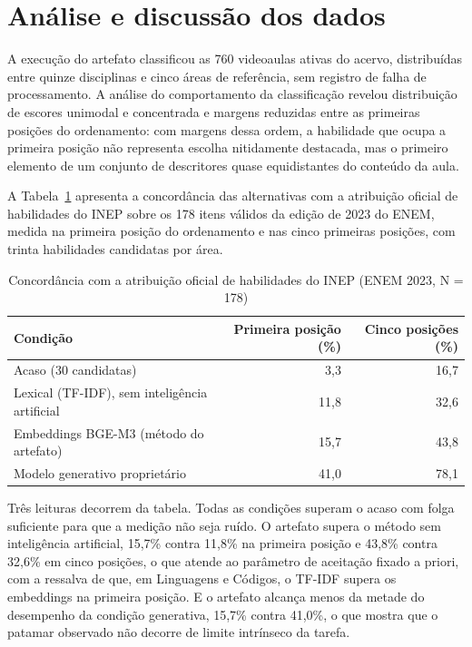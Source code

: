 
\section{Análise e discussão dos dados}

A execução do artefato classificou as 760 videoaulas ativas do acervo,
distribuídas entre quinze disciplinas e cinco áreas de referência, sem registro
de falha de processamento. A análise do comportamento da classificação revelou
distribuição de escores unimodal e concentrada e margens reduzidas entre as
primeiras posições do ordenamento: com margens dessa ordem, a habilidade que
ocupa a primeira posição não representa escolha nitidamente destacada, mas o
primeiro elemento de um conjunto de descritores quase equidistantes do conteúdo
da aula.

A Tabela~\ref{tab:concordancia} apresenta a concordância das alternativas com a
atribuição oficial de habilidades do INEP sobre os 178 itens válidos da edição
de 2023 do ENEM, medida na primeira posição do ordenamento e nas cinco
primeiras posições, com trinta habilidades candidatas por área.

\begin{table}[htb]
  \caption{Concordância com a atribuição oficial de habilidades do INEP (ENEM 2023, N = 178)}
  \label{tab:concordancia}
  \centering
  \begin{tabular}{lrr}
    \toprule
    \textbf{Condição} & \textbf{Primeira posição (\%)} & \textbf{Cinco posições (\%)} \\
    \midrule
    Acaso (30 candidatas)                         &  3,3 & 16,7 \\
    Lexical (TF-IDF), sem inteligência artificial & 11,8 & 32,6 \\
    Embeddings BGE-M3 (método do artefato)        & 15,7 & 43,8 \\
    Modelo generativo proprietário                & 41,0 & 78,1 \\
    \bottomrule
  \end{tabular}
\end{table}

Três leituras decorrem da tabela. Todas as condições superam o acaso com folga
suficiente para que a medição não seja ruído. O artefato supera o método sem
inteligência artificial, 15,7\% contra 11,8\% na primeira posição e 43,8\%
contra 32,6\% em cinco posições, o que atende ao parâmetro de aceitação fixado
a priori, com a ressalva de que, em Linguagens e Códigos, o TF-IDF supera os
embeddings na primeira posição. E o artefato alcança menos da metade do
desempenho da condição generativa, 15,7\% contra 41,0\%, o que mostra que o
patamar observado não decorre de limite intrínseco da tarefa.

